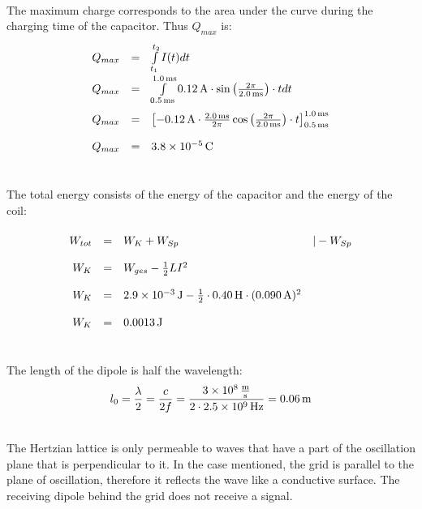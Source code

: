 \documentclass[a4paper]{article}
\begin{document}
	\\
	The maximum charge corresponds to the area under the curve during the charging time of the capacitor. Thus $Q_{max}$ is:
	$$
	\renewcommand{\arraystretch}{2}
	\begin{array}{rcll}
		Q_{max} &=& \int\limits_{t_1}^{t_2}I(t)dt\\
		Q_{max} &=& \int\limits_{\SI{0.5}{\milli\second}}^{\SI{1.0}{\milli\second}}\SI{0.12}{ \ampere} \cdot \sin{\left({2\pi \over \SI{2,0}{\milli\second}}\right) \cdot t}dt \\
		Q_{max} &=& \left[\SI{-0.12}{\ampere} \cdot{\SI{2.0}{\milli\second}\over 2\pi} \cos{\left( 2\pi \over \SI{2,0}{\milli\second}\right)\cdot t} \right]_{\SI{0.5}{\milli\second}}^{\SI{1 ,0}{\milli\second}}\\
		Q_{max} &=& \SI{3.8e-5}{\coulomb}
	\end{array}
	$$
	\vspace{0.5 cm}
	
	\\
	The total energy consists of the energy of the capacitor and the energy of the coil:
	$$
	\renewcommand{\arraystretch}{2}
	\begin{array}{rcll}
		W_{tot} & = & W_{K} + W_{Sp} &| - W_{Sp}\\
		W_{K} & = & W_{ges}- {1 \over 2} LI^2\\
		W_{K} & = & \SI{2.9e-3}{\joule} - {1 \over 2}\cdot \SI{0.40}{\henry} \cdot (\SI{0.090}{\ampere})^2\\
		W_{K} & = & \SI{0.0013}{\joule}
	\end{array}
	$$
	\vspace{0.5 cm}
	
	\\
	The length of the dipole is half the wavelength:
	$$l_0 = {\lambda \over 2} = {c \over 2 f} = {\SI{3e8}{\meter\over \second}\over 2\cdot \SI{2.5e9}{\hertz} } = \SI{0.06}{\meter} $$
	\vspace{0.5 cm}
	
	\\
	The Hertzian lattice is only permeable to waves that have a part of the oscillation plane that is perpendicular to it. In the case mentioned, the grid is parallel to the plane of oscillation, therefore it reflects the wave like a conductive surface. The receiving dipole behind the grid does not receive a signal.
	\vspace{0.5 cm}
	
\end{document}
